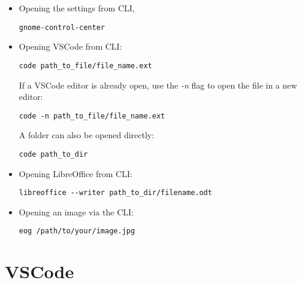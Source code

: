 \documentclass[12pt, a4paper]{scrbook}
\numberwithin{equation}{section}
\theoremstyle{definition}
\theoremstyle{definition}
\begin{document}
		\begin{itemize}
			\item Opening the settings from CLI, 
			
			\begin{lstlisting}[style=mystylebash, label=alg:cli_settings, xleftmargin=\parindent]
				gnome-control-center
			\end{lstlisting}
			
			\item Opening VSCode from CLI: 
			
			\begin{lstlisting}[style=mystylebash, label=alg:ubuntu__vscode_file, xleftmargin=\parindent]
				code path_to_file/file_name.ext
			\end{lstlisting}
			
			If a VSCode editor is already open, use the \textit{-n} flag to open the file in a new editor:
			
			\begin{lstlisting}[style=mystylebash, label=alg:ubuntu__vscode_file_new_editor, xleftmargin=\parindent]
				code -n path_to_file/file_name.ext
			\end{lstlisting}
			
			A folder can also be opened directly:
			\begin{lstlisting}[style=mystylebash, label=alg:ubuntu__vscode_dir, caption=Opening VSCode dir from CLI, xleftmargin=\parindent]
				code path_to_dir
			\end{lstlisting}
			
			\item Opening LibreOffice from CLI:
			
			\begin{lstlisting}[style=mystylebash, label=alg:ubuntu__libre_office, xleftmargin=\parindent]
				libreoffice --writer path_to_dir/filename.odt
			\end{lstlisting}
			
			\item Opening an image via the CLI: 
			
			\begin{lstlisting}[style=mystylebash, label=alg:ubuntu_eog, xleftmargin=\parindent]
				eog /path/to/your/image.jpg
			\end{lstlisting}
			
		\end{itemize}

\chapter{VSCode}
\end{document}
